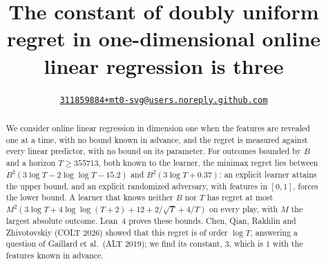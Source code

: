 \documentclass[12pt]{amsart}
\makeatletter
\newcommand{\repo}{https://github.com/mt0-svg/regret-kappa}
\DeclareRobustCommand{\authorlink}{\href{\repo/issues/new/choose}{\nolinkurl{311859884+mt0-svg@users.noreply.github.com}}}
\theoremstyle{definition}
\numberwithin{equation}{section}
\makeatother
\begin{document}
\title[Doubly uniform regret in dimension one]{The constant of doubly uniform regret in one-dimensional online linear regression is three}
\author{\authorlink}

\begin{abstract}
We consider online linear regression in dimension one when the features are revealed one at a time, with no bound known in advance, and the regret is measured against every linear predictor, with no bound on its parameter. For outcomes bounded by $B$ and a horizon $T\ge355713$, both known to the learner, the minimax regret lies between $B^2(3\log T-2\log\log T-15.2)$ and $B^2(3\log T+0.37)$: an explicit learner attains the upper bound, and an explicit randomized adversary, with features in $[0,1]$, forces the lower bound. A learner that knows neither $B$ nor $T$ has regret at most $M^2(3\log T+4\log\log(T+2)+12+2/\sqrt T+4/T)$ on every play, with $M$ the largest absolute outcome. Lean~4 proves these bounds. Chen, Qian, Rakhlin and Zhivotovskiy (COLT 2026) showed that this regret is of order $\log T$, answering a question of Gaillard et al.~(ALT 2019); we find its constant, $3$, which is $1$ with the features known in advance.

\end{abstract}


\maketitle
\end{document}
